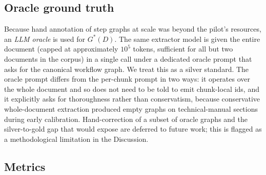 \documentclass[make,article,submit,oneauthor,pdftex]{Definitions/mdpi}
\begin{document}
\subsection{Oracle ground truth}\label{sec:oracle}

Because hand annotation of step graphs at scale was beyond the pilot's
resources, an \emph{LLM oracle} is used for $G^{*}(D)$. The same
extractor model is given the entire document (capped at approximately
$10^5$ tokens, sufficient for all but two documents in the corpus) in
a single call under a dedicated oracle prompt that asks for the
canonical workflow graph. We treat this as a silver standard. The
oracle prompt differs from the per-chunk prompt in two ways:
it operates over the whole document and so does not need to be told to
emit chunk-local ids, and it explicitly asks for thoroughness rather
than conservatism, because conservative whole-document extraction
produced empty graphs on technical-manual sections during early
calibration. Hand-correction of a subset of oracle graphs and the
silver-to-gold gap that would expose are deferred to future work; this
is flagged as a methodological limitation in the Discussion.

\subsection{Metrics}
\end{document}
